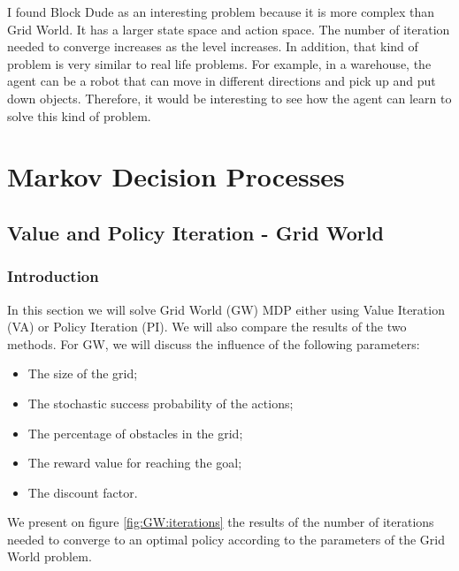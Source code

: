 \documentclass[10pt, twocolumn]{article}
\begin{document}
			I found Block Dude as an interesting problem because it is more complex than Grid World. It has a larger state space and action space. The number of iteration needed to converge increases as the level increases. In addition, that kind of problem is very similar to real life problems. For example, in a warehouse, the agent can be a robot that can move in different directions and pick up and put down objects. Therefore, it would be interesting to see how the agent can learn to solve this kind of problem.
	\section{Markov Decision Processes}
		\subsection{Value and Policy Iteration - Grid World}
			\subsubsection*{Introduction}
				In this section we will solve Grid World (GW) MDP either using Value Iteration (VA) or Policy Iteration (PI). We will also compare the results of the two methods. For GW, we will discuss the influence of the following parameters:
				\begin{itemize}
					\item The size of the grid;
					\item The stochastic success probability of the actions;
					\item The percentage of obstacles in the grid;
					\item The reward value for reaching the goal;
					\item The discount factor.
				\end{itemize}
				We present on figure \ref{fig:GW:iterations} the results of the number of iterations needed to converge to an optimal policy according to the parameters of the Grid World problem.
\end{document}
